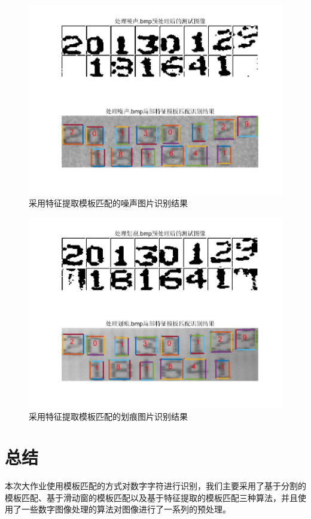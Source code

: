 \documentclass[cn]{elegantbook}
\begin{document}
\begin{figure}[!h]
	\centering
	\includegraphics[width=\textwidth]{save28}
	\caption{\label{feat3}采用特征提取模板匹配的噪声图片识别结果}
\end{figure}
\begin{figure}[!h]
	\centering
	\includegraphics[width=\textwidth]{save27}
	\caption{\label{feat4}采用特征提取模板匹配的划痕图片识别结果}
\end{figure}

\chapter{总结}
本次大作业使用模板匹配的方式对数字字符进行识别，我们主要采用了基于分割的模板匹配、基于滑动窗的模板匹配以及基于特征提取的模板匹配三种算法，并且使用了一些数字图像处理的算法对图像进行了一系列的预处理。
\end{document}
